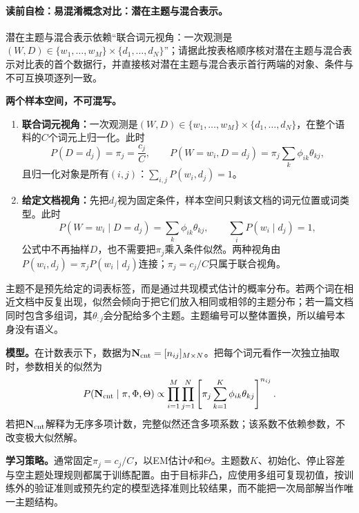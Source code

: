\paragraph{读前自检：易混淆概念对比：潜在主题与混合表示。}潜在主题与混合表示依赖“联合词元视角：一次观测是$(W,D)\in\{w_1,\ldots,w_M\}\times\{d_1,\ldots,d_N\}$”；请据此按表格顺序核对潜在主题与混合表示对比表的首个数据行，并直接核对潜在主题与混合表示首行两端的对象、条件与不可互换项逐列一致。\par

\begin{comparisonbox}
\textbf{两个样本空间，不可混写。}
\begin{enumerate}[leftmargin=2.2em]
  \item \textbf{联合词元视角：}一次观测是$(W,D)\in\{w_1,\ldots,w_M\}\times\{d_1,\ldots,d_N\}$，在整个语料的$C$个词元上归一化。此时
  \[
  P(D=d_j)=\pi_j=\frac{c_j}{C},\qquad
  P(W=w_i,D=d_j)=\pi_j\sum_k\phi_{ik}\theta_{kj},
  \]
  且归一化对象是所有$(i,j)$：$\sum_{i,j}P(w_i,d_j)=1$。
  \item \textbf{给定文档视角：}先把$d_j$视为固定条件，样本空间只剩该文档的词元位置或词类型。此时
  \[
  P(W=w_i\mid D=d_j)=\sum_k\phi_{ik}\theta_{kj},
  \qquad \sum_iP(w_i\mid d_j)=1,
  \]
  公式中不再抽样$D$，也不需要把$\pi_j$乘入条件似然。两种视角由
  $P(w_i,d_j)=\pi_jP(w_i\mid d_j)$连接；$\pi_j=c_j/C$只属于联合视角。
\end{enumerate}
\end{comparisonbox}

主题不是预先给定的词表标签，而是通过共现模式估计的概率分布。若两个词在相近文档中反复出现，似然会倾向于把它们放入相同或相邻的主题分布；若一篇文档同时包含多组词，其$\theta_{:j}$会分配给多个主题。主题编号可以整体置换，所以编号本身没有语义。

\label{struct:V4-C06-CH08}
\textbf{模型。}在计数表示下，数据为$\mathbf N_{\rm cnt}=[n_{ij}]_{M\times N}$。把每个词元看作一次独立抽取时，参数相关的似然为
\[
P(\mathbf N_{\rm cnt}\mid\pi,\Phi,\Theta)\propto
\prod_{i=1}^M\prod_{j=1}^N
\left[\pi_j\sum_{k=1}^K\phi_{ik}\theta_{kj}\right]^{n_{ij}}.
\]
若把$\mathbf N_{\rm cnt}$解释为无序多项计数，完整似然还含多项系数；该系数不依赖参数，不改变极大似然解。

\label{struct:V4-C06-CH09}
\textbf{学习策略。}通常固定$\pi_j=c_j/C$，以EM估计$\Phi$和$\Theta$。主题数$K$、初始化、停止容差与空主题处理规则都属于训练配置。由于目标非凸，应使用多组可复现初值，按训练外的验证准则或预先约定的模型选择准则比较结果，而不能把一次局部解当作唯一主题结构。


